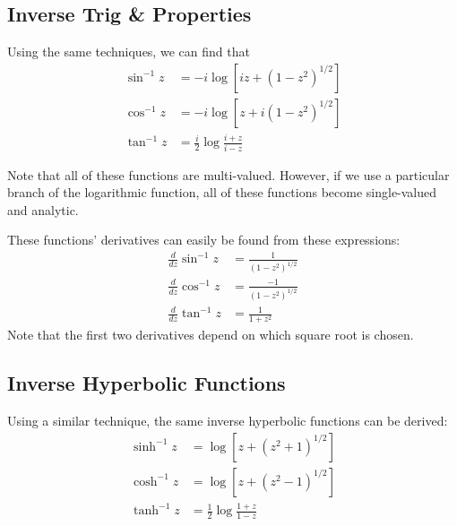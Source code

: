 \documentclass{article}
\begin{document}
\subsection{Inverse Trig \& Properties}
Using the same techniques, we can find that
\begin{align*}
	\sin^{-1} z &= -i \log[iz + (1 - z^2)^{1/2}] \\
	\cos^{-1} z &= -i \log[z + i(1 - z^2)^{1/2}] \\
	\tan^{-1} z &= \frac{i}{2} \log \frac{i + z}{i - z}
\end{align*}

Note that all of these functions are multi-valued. However, if we use a particular branch of the logarithmic function, all of these functions become single-valued and analytic.

These functions' derivatives can easily be found from these expressions:
\begin{align*}
	\frac{d}{dz} \sin^{-1} z &= \frac{ 1}{(1 - z^2)^{1/2}} \\
	\frac{d}{dz} \cos^{-1} z &= \frac{-1}{(1 - z^2)^{1/2}} \\
	\frac{d}{dz} \tan^{-1} z &= \frac{1}{1 + z^2}
\end{align*}
Note that the first two derivatives depend on which square root is chosen.

\subsection{Inverse Hyperbolic Functions}
Using a similar technique, the same inverse hyperbolic functions can be derived:
\begin{align*}
	\sinh^{-1} z &= \log[z + (z^2 + 1)^{1/2}] \\
	\cosh^{-1} z &= \log[z + (z^2 - 1)^{1/2}] \\
	\tanh^{-1} z &= \frac{1}{2} \log \frac{1 + z}{1 - z}
\end{align*}
\end{document}
